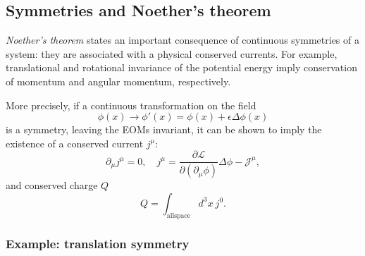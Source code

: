 \subsection{Symmetries and Noether's theorem}
\label{sec:01_qft_classical_symmetries}

\textit{Noether's theorem} states an important consequence of continuous symmetries of a system: they are associated with a physical conserved currents.
For example, translational and rotational invariance of the potential energy imply conservation of momentum and angular momentum, respectively.

More precisely, if a continuous transformation on the field
\begin{equation}
	\label{eq:01_qft_symmetries_transformation}
	\phi(x) \rightarrow \phi'(x) = \phi(x) + \epsilon\Delta\phi(x)
\end{equation}
is a symmetry, leaving the EOMs invariant,
it can be shown to imply the existence of a conserved current $j^\mu$:
\begin{equation}
	\label{eq:01_qft_symmetries_current}
	\partial_\mu j^\mu = 0, \quad j^\mu = \frac{\partial\mathcal L}{\partial(\partial_\mu\phi)}\Delta\phi - \mathcal J^\mu,
\end{equation}
and conserved charge $Q$
\begin{equation}
	\label{eq:01_qft_symmetries_charge}
	Q = \int_\mathrm{all space} d^3x\ j^0.
\end{equation}


\subsubsection{Example: translation symmetry}

